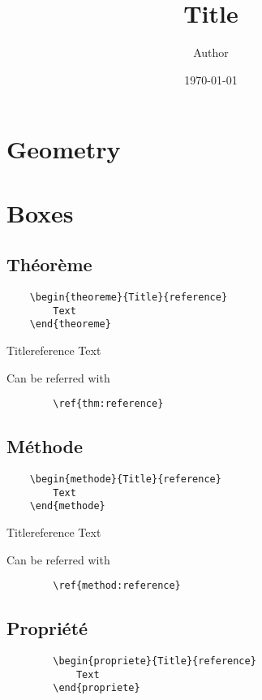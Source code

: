 \documentclass[french]{article}
\title{Title}
\date{\today{}}
\author{Author}
\begin{document}
\maketitle
    \section{Geometry}
    \lipsum[0-3]

    \section{Boxes}

    \subsection{Théorème}
    
    \begin{verbatim}
    \begin{theoreme}{Title}{reference}
        Text
    \end{theoreme}
    \end{verbatim}

    \begin{theoreme}{Title}{reference}
        Text
    \end{theoreme}

    Can be referred with 
    \begin{verbatim} 
        \ref{thm:reference}
    \end{verbatim}

    \subsection{Méthode}
    
    \begin{verbatim}
    \begin{methode}{Title}{reference}
        Text
    \end{methode}
    \end{verbatim}

    \begin{methode}{Title}{reference}
        Text
    \end{methode}

    Can be referred with 
    \begin{verbatim} 
        \ref{method:reference}
    \end{verbatim}

    \subsection{Propriété}
    \begin{verbatim}
        \begin{propriete}{Title}{reference}
            Text
        \end{propriete}
    \end{verbatim}
\end{document}

